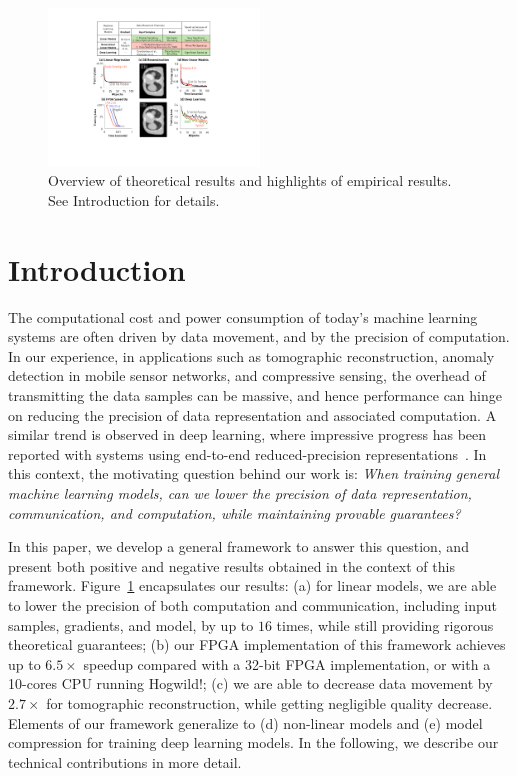 \documentclass{article}
\begin{document}
\begin{figure}[t]
\centering
\includegraphics[width=0.5\textwidth]{Figures/RSHighlight}    
\vspace{-2em}
\caption{Overview of theoretical results and
highlights of empirical results. See
Introduction for details.}
\vspace{-1em}
\label{fig:highlight}
\end{figure}

\vspace{-3em}
\section{Introduction}

\vspace{-1em}
The computational cost and power consumption of today's machine learning systems are often driven by data movement, and by the precision of computation. 
In our experience, in applications such as tomographic reconstruction, anomaly detection in mobile sensor networks,
and compressive sensing, the overhead of transmitting the data samples can be massive, 
and hence performance can hinge on reducing the precision of data representation and 
associated computation. 
A similar trend is observed in deep learning, where impressive progress has been reported with systems 
using end-to-end reduced-precision representations~\cite{hubara2016quantized,
rastegari2016xnor,zhou2016dorefa,miyashita2016convolutional}. 
In this context, the motivating question behind our work is:  {\em When training general machine learning models,
can we lower the precision of data representation,
communication, and computation, while maintaining provable guarantees?}
 
In this paper, we develop a general 
framework to answer this question, and
present both  positive and negative results
 obtained in the context of this framework. 
 Figure~\ref{fig:highlight} encapsulates our results: 
(a) for linear models, we are able to lower the precision of both computation and communication, including input samples, gradients, and model, by up to $16$ times, while still providing rigorous theoretical guarantees; 
(b) our FPGA implementation of this framework achieves up to $6.5\times$ speedup compared with
a 32-bit FPGA implementation, or with a 10-cores CPU running Hogwild!;  
(c) we are able to decrease data movement by $2.7\times$ for
tomographic reconstruction, while getting negligible quality decrease. 
Elements of our framework generalize to (d) non-linear models and  (e) model compression for training deep learning models. 
In the following, we describe our technical contributions in more detail. 
\end{document}
